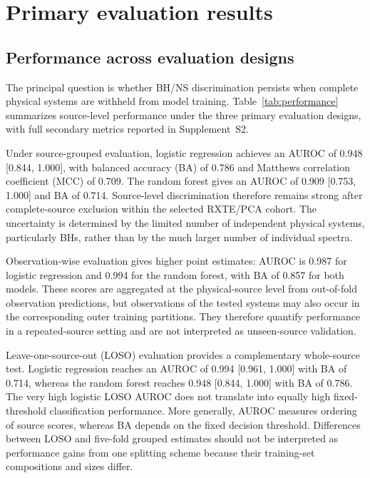 \documentclass[final,5p,authoryear,nopreprintline]{elsarticle}
\begin{document}
\section{Primary evaluation results}
\label{sec:5}

\subsection{Performance across evaluation designs}

The principal question is whether BH/NS discrimination persists when complete physical systems are withheld from model training. Table~\ref{tab:performance} summarizes source-level performance under the three primary evaluation designs, with full secondary metrics reported in Supplement~S2.

Under source-grouped evaluation, logistic regression achieves an AUROC of 0.948 [0.844, 1.000], with balanced accuracy (BA) of 0.786 and Matthews correlation coefficient (MCC) of 0.709. The random forest gives an AUROC of 0.909 [0.753, 1.000] and BA of 0.714. Source-level discrimination therefore remains strong after complete-source exclusion within the selected RXTE/PCA cohort. The uncertainty is determined by the limited number of independent physical systems, particularly BHs, rather than by the much larger number of individual spectra.

Observation-wise evaluation gives higher point estimates: AUROC is 0.987 for logistic regression and 0.994 for the random forest, with BA of 0.857 for both models. These scores are aggregated at the physical-source level from out-of-fold observation predictions, but observations of the tested systems may also occur in the corresponding outer training partitions. They therefore quantify performance in a repeated-source setting and are not interpreted as unseen-source validation.

Leave-one-source-out (LOSO) evaluation provides a complementary whole-source test. Logistic regression reaches an AUROC of 0.994 [0.961, 1.000] with BA of 0.714, whereas the random forest reaches 0.948 [0.844, 1.000] with BA of 0.786. The very high logistic LOSO AUROC does not translate into equally high fixed-threshold classification performance. More generally, AUROC measures ordering of source scores, whereas BA depends on the fixed decision threshold. Differences between LOSO and five-fold grouped estimates should not be interpreted as performance gains from one splitting scheme because their training-set compositions and sizes differ.
\end{document}
